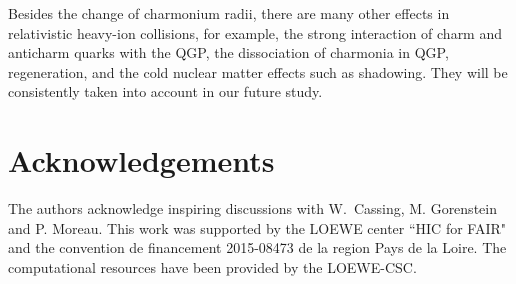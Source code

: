 \documentclass[twocolumn,aps,superscriptaddress,showpacs,nofootinbib,floatfix]{revtex4}
\begin{document}
Besides the change of charmonium radii, there are many other effects in relativistic heavy-ion collisions, for example, the strong interaction of charm and anticharm quarks with the QGP, the dissociation of charmonia in QGP, regeneration, and the cold nuclear matter effects such as shadowing.
They will be consistently taken into account in our future study.

\section*{Acknowledgements}
The authors acknowledge inspiring discussions with W.~Cassing,
M. Gorenstein and P. Moreau.
This work was supported by the LOEWE center ``HIC for FAIR" and the convention de financement 2015-08473 de la
region Pays de la Loire. The computational resources have been
provided by the LOEWE-CSC.
\end{document}
